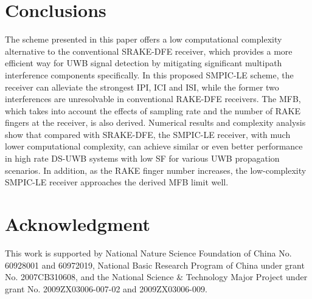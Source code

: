 \documentclass[journal]{IEEEtran}
\begin{document}
\section{Conclusions}
The scheme presented in this paper offers a low computational
complexity alternative to the conventional SRAKE-DFE receiver, which
provides a more efficient way for UWB signal detection by mitigating
significant multipath interference components specifically. In this
proposed SMPIC-LE scheme, the receiver can alleviate the strongest
IPI, ICI and ISI, while the former two interferences are
unresolvable in conventional RAKE-DFE receivers. The MFB, which
takes into account the effects of sampling rate and the number of
RAKE fingers at the receiver, is also derived. Numerical results and
complexity analysis show that compared with SRAKE-DFE, the SMPIC-LE
receiver, with much lower computational complexity, can achieve
similar or even better performance in high rate DS-UWB systems with
low SF for various UWB propagation scenarios. In addition, as the
RAKE finger number increases, the low-complexity SMPIC-LE receiver
approaches the derived MFB limit well.

\section*{Acknowledgment}
This work is supported by National Nature Science Foundation of
China No. 60928001 and 60972019, National Basic Research Program of
China under grant No. 2007CB310608, and the National Science \&
Technology Major Project under grant No. 2009ZX03006-007-02 and
2009ZX03006-009.
\end{document}
